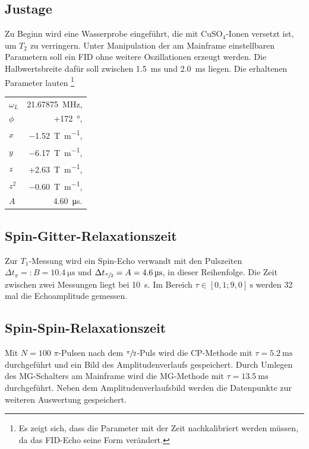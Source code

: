 \subsection{Justage}
Zu Beginn wird eine Wasserprobe eingeführt, die mit CuSO$_4$-Ionen versetzt ist, um $T_2$ zu verringern. Unter Manipulation der am Mainframe
einstellbaren Parametern soll ein FID ohne weitere Oszillationen erzeugt werden. Die Halbwertsbreite dafür soll zwischen \SI{1,5}{\ms} und
\SI{2,0}{\ms} liegen. Die erhaltenen Parameter lauten \footnote{Es zeigt sich, dass die Parameter mit der Zeit nachkalibriert werden müssen, da
das FID-Echo seine Form verändert.}
\begin{table}[h]
\begin{tabular}{l@{=}r}
 $\omega_L$ \quad& \quad\SI{21.67875}{\MHz},\\
 $\phi$ & +\SI{172}{\degree},\\
 $x$ & \SI{-1,52}{\tesla\per \m},\\
 $y$ & \SI{-6,17}{\tesla\per \m},\\
 $z$ & +\SI{2,63}{\tesla\per \m},\\
 $z^2$ & \SI{-0,60}{\tesla\per \m},\\
 $A$ & \SI{4,60}{\micro\second}.
\end{tabular}
\end{table}

\subsection{Spin-Gitter-Relaxationszeit}
Zur $T_1$-Messung wird ein Spin-Echo verwandt mit den Pulszeiten $\Delta t_{\pi} =: B = \SI{10,4}{\micro\second}$
und $\Delta t_{\sfrac{\pi}{2}} = A = \SI{4,6}{\micro\second}$, in dieser Reihenfolge.
Die Zeit zwischen zwei Messungen liegt bei \SI{10}{\second}. 
Im Bereich $\tau\in[0,1; 9,0]\SI{}{\second}$ werden 32 mal die Echoamplitude gemessen.
\subsection{Spin-Spin-Relaxationszeit}
Mit $N=100$ $\pi$-Pulsen nach dem $\sfrac{\pi}{2}$-Puls wird die CP-Methode mit $\tau = \SI{5.2}{\milli\second}$ durchgeführt und ein 
Bild des Amplitudenverlaufs gespeichert. Durch Umlegen des MG-Schalters am Mainframe wird die MG-Methode mit $\tau = \SI{13.5}{\milli\second}$ 
durchgeführt. Neben dem Amplitudenverlaufsbild werden die Datenpunkte zur weiteren Auswertung gespeichert.

